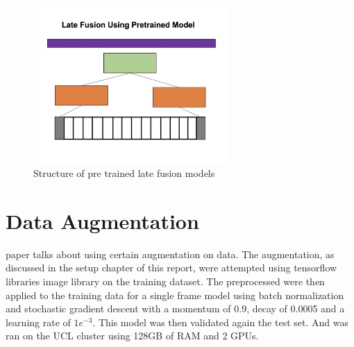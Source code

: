 \begin{figure}
\centering
    \includegraphics[width=75mm,scale=0.5]{pretrained-late.png}
    \caption{Structure of pre trained late fusion models}
    \label{fig:pretrained-late}
\end{figure}


\section{Data Augmentation}
\citep{KarpathyCVPR14} paper talks about using certain augmentation on data. The augmentation, as discussed in the setup chapter of this report, were attempted using tensorflow libraries image library on the training dataset. The preprocessed were then applied to the training data for a single frame model using batch normalization and stochastic gradient descent with a momentum of 0.9,  decay of 0.0005 and a learning rate of $1e^{-3}$.  This model was then validated again the test set. And was ran on the UCL cluster using 128GB of RAM and 2 GPUs.







